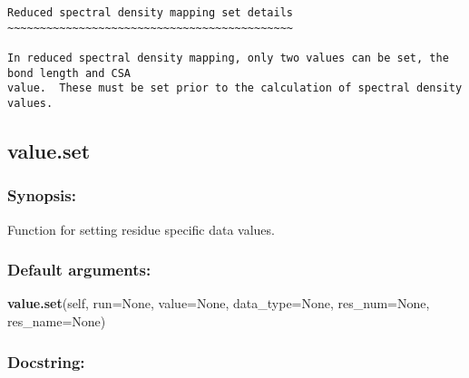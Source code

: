 {\begin{verbatim}
Reduced spectral density mapping set details
~~~~~~~~~~~~~~~~~~~~~~~~~~~~~~~~~~~~~~~~~~~~

In reduced spectral density mapping, only two values can be set, the bond length and CSA
value.  These must be set prior to the calculation of spectral density values.
\end{verbatim}
}



\newpage

\subsection{value.set}


\subsubsection{Synopsis:}

Function for setting residue specific data values.

\subsubsection{Default arguments:}

\textsf{\textbf{value.set}(self, run=None, value=None, data\_type=None, res\_num=None, res\_name=None)
}


\subsubsection{Docstring:}

